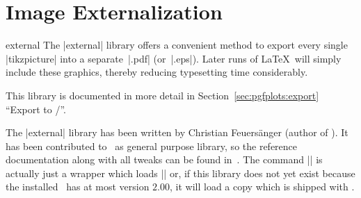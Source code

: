 
\section{Image Externalization}
\begingroup
\def\pgfplotsmanualcurlibrary{external}
\begin{pgfplotslibrary}{external}
	The |external| library offers a convenient method to export every single |tikzpicture| into a separate~|.pdf| (or~|.eps|). Later runs of \LaTeX\ will simply include these graphics, thereby reducing typesetting time considerably.
	
	This library is documented in more detail in Section~\ref{sec:pgfplots:export} ``Export to {\pdf/\eps}''.


	The |external| library has been written by Christian Feuers\"anger (author of \PGFPlots). It has been contributed to \Tikz\ as general purpose library, so the reference documentation along with all tweaks can be found in~\cite[Section ``Externalization Library'']{tikz}. The command || is actually just a wrapper which loads |\usetikzlibrary{external}| or, if this library does not yet exist because the installed \pgfname\ has at most version $2.00$, it will load a copy which is shipped with \PGFPlots.
\end{pgfplotslibrary}
\endgroup
